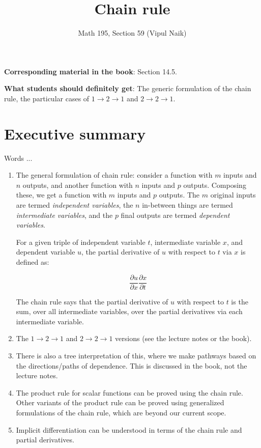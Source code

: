 \documentclass[10pt]{amsart}
\title{Chain rule}
\author{Math 195, Section 59 (Vipul Naik)}
\begin{document}
\maketitle

{\bf Corresponding material in the book}: Section 14.5.

{\bf What students should definitely get}: The generic formulation of
the chain rule, the particular cases of $1 \to 2 \to 1$ and $2 \to 2
\to 1$.

\section*{Executive summary}

Words ...

\begin{enumerate}
\item The general formulation of chain rule: consider a function with
  $m$ inputs and $n$ outputs, and another function with $n$ inputs and
  $p$ outputs. Composing these, we get a function with $m$ inputs and
  $p$ outputs. The $m$ original inputs are termed {\em independent
  variables}, the $n$ in-between things are termed {\em intermediate
  variables}, and the $p$ final outputs are termed {\em dependent
  variables}.

  For a given triple of independent variable $t$, intermediate
  variable $x$, and dependent variable $u$, the partial derivative of
  $u$ with respect to $t$ via $x$ is defined as:

  $$\frac{\partial u}{\partial x} \frac{\partial x}{\partial t}$$

  The chain rule says that the partial derivative of $u$ with respect
  to $t$ is the sum, over all intermediate variables, over the partial
  derivatives via each intermediate variable.
\item The $1 \to 2 \to 1$ and $2 \to 2 \to 1$ versions (see the
  lecture notes or the book).
\item There is also a tree interpretation of this, where we make
  pathways based on the directions/paths of dependence. This is
  discussed in the book, not the lecture notes.
\item The product rule for scalar functions can be proved using the
  chain rule. Other variants of the product rule can be proved using
  generalized formulations of the chain rule, which are beyond our
  current scope.
\item Implicit differentiation can be understood in terms of the chain
  rule and partial derivatives.
\end{enumerate}
\end{document}
